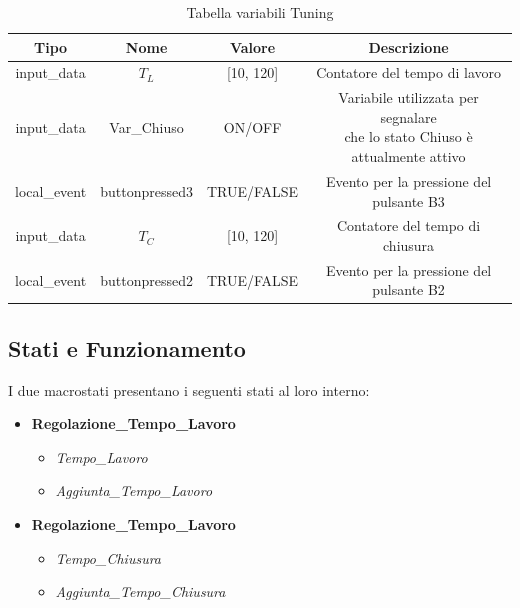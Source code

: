             \begin{table}[H]
                \centering
                    \begin{tabular}{ | c | c | c | c |} 
                        \hline
                        
                        \textbf{Tipo} & \textbf{Nome} & \textbf{Valore} & \textbf{Descrizione} \\ 
                        \hline
                        
                        input\_data & $T_L$ & [10, 120] & Contatore del tempo di lavoro \\ 
                        \hline
                        
                        input\_data & Var\_Chiuso & ON/OFF & \makecell{Variabile utilizzata per segnalare \\ che lo stato Chiuso è attualmente attivo} \\ 
                        \hline
                        
                        local\_event & buttonpressed3 & TRUE/FALSE & Evento per la pressione del pulsante B3 \\ 
                        \hline
                        
                        input\_data & $T_C$ & [10, 120] & Contatore del tempo di chiusura \\ 
                        \hline
                        
                        local\_event & buttonpressed2 & TRUE/FALSE & Evento per la pressione del pulsante B2 \\ 
                        \hline
                    \end{tabular}
                \caption{Tabella variabili Tuning}
            \end{table}

        \subsection{Stati e Funzionamento}
            \noindent I due macrostati presentano i seguenti stati al loro interno:
            
            \begin{itemize}
                \item \textbf{Regolazione\_Tempo\_Lavoro}
                \begin{itemize}
                    \item \textit{Tempo\_Lavoro}
                    \item \textit{Aggiunta\_Tempo\_Lavoro}
                \end{itemize}

                \item \textbf{Regolazione\_Tempo\_Lavoro}
                \begin{itemize}
                    \item \textit{Tempo\_Chiusura}
                    \item \textit{Aggiunta\_Tempo\_Chiusura}
                \end{itemize}
            \end{itemize}


